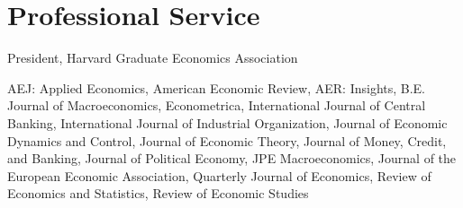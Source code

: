 \documentclass[letterpaper]{article}
\def\footerlink{http://jblevins.org/projects/cv-template/}
\begin{document}
\section*{Professional Service}
\begin{description}[labelindent=0pt, labelwidth=1in, labelsep*=1em, leftmargin =!, font=\normalfont]
\item[2020--2021] President, Harvard Graduate Economics Association
\item[Refereeing] {AEJ: Applied Economics, American Economic Review, AER: Insights, B.E. Journal of Macroeconomics, Econometrica, International Journal of Central Banking, International Journal of Industrial Organization, Journal of Economic Dynamics and Control, Journal of Economic Theory, Journal of Money, Credit, and Banking, Journal of Political Economy, JPE Macroeconomics, Journal of the European Economic Association, Quarterly Journal of Economics, Review of Economics and Statistics, Review of Economic Studies}
\end{description}


\end{document}
